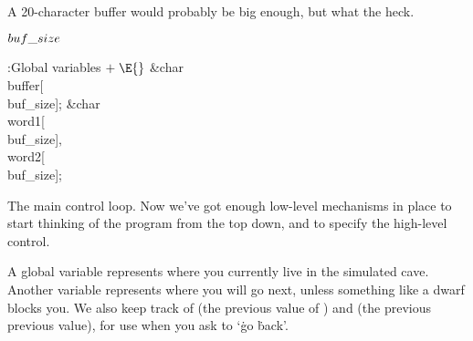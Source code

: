 A 20-character buffer would probably be big enough, but what the heck.

\Y\B\4\D$\\{buf\_size}$ \5
\par
\Y\B\4:Global variables\X${}\mathrel+\E{}$\6
\&{char} \\{buffer}[\\{buf\_size}];\6
\&{char} \\{word1}[\\{buf\_size}]${},{}$ \\{word2}[\\{buf\_size}];\par
\fi

The main control loop. Now we've got enough low-level mechanisms in
place to start thinking of the program from the top down, and to
specify the high-level control.

A global variable  represents where you currently live in the
simulated cave. Another variable  represents where you will
go next, unless something like a dwarf blocks you. We also keep
track of  (the previous value of ) and 
(the previous previous value), for use when you ask to `\.{go} \.{back}'.

